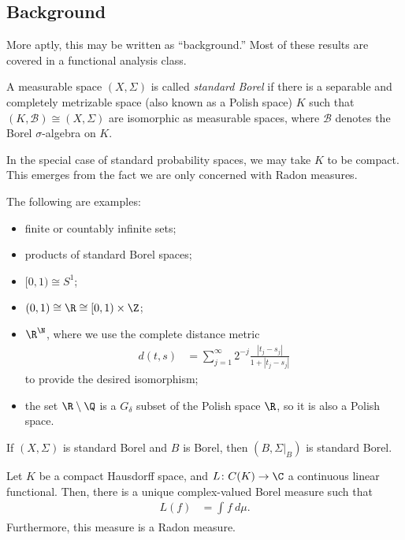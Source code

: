\documentclass[10pt]{mypackage}
\begin{document}
\subsection{Background}%
More aptly, this may be written as ``background.'' Most of these results are covered in a functional analysis class.
\begin{definition}
  A measurable space $\left( X,\Sigma \right)$ is called \textit{standard Borel} if there is a separable and completely metrizable space (also known as a Polish space) $K$ such that $\left( K, \mathcal{B} \right)\cong \left( X,\Sigma \right)$ are isomorphic as measurable spaces, where $ \mathcal{B} $ denotes the Borel $\sigma$-algebra on $K$.
\end{definition}
\begin{remark}
  In the special case of standard probability spaces, we may take $K$ to be compact. This emerges from the fact we are only concerned with Radon measures.
\end{remark}
\begin{example}
  The following are examples:
  \begin{itemize}
    \item finite or countably infinite sets;
    \item products of standard Borel spaces;
    \item $[0,1)\cong S^1$;
    \item $(0,1)\cong \R\cong [0,1)\times \Z$;
    \item $\R^{\N}$, where we use the complete distance metric
      \begin{align*}
        d\left( t,s \right) &= \sum_{j=1}^{\infty} 2^{-j} \frac{\left\vert t_j-s_j \right\vert}{1 + \left\vert t_j-s_j \right\vert}
      \end{align*}
      to provide the desired isomorphism;
    \item the set $\R\setminus \Q$ is a $G_{\delta}$ subset of the Polish space $\R$, so it is also a Polish space.
  \end{itemize}
\end{example}
\begin{theorem}
  If $\left( X,\Sigma \right)$ is standard Borel and $B$ is Borel, then $\left( B,\Sigma|_{B} \right)$ is standard Borel.
\end{theorem}
\begin{theorem}
  Let $K$ be a compact Hausdorff space, and $L\colon C(K)\rightarrow \C$ a continuous linear functional. Then, there is a unique complex-valued Borel measure such that
  \begin{align*}
    L(f) &= \int_{}^{} f\:d\mu.
  \end{align*}
  Furthermore, this measure is a Radon measure.
\end{theorem}
\end{document}
